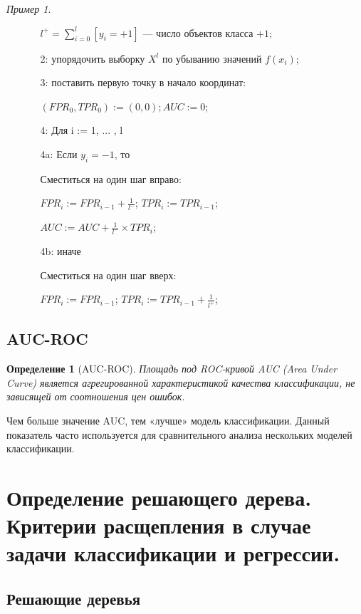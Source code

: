 \documentclass[a4paper, 12pt]{article}
\theoremstyle{plain} %
\newtheorem{definition}{Определение}
\theoremstyle{definition} %
\theoremstyle{remark} %
\newtheorem{example}{Пример}
\begin{document}
\begin{example}
\begin{enumerate}
\begin{enumerate}
			$l^{+} = \sum^{l}_{i=0}[y_{i}=+1]$ --- число объектов класса $+1$;
			\item[2:] упорядочить выборку $X^{l}$ по убыванию значений $f(x_{i})$;
			\item[3:] поставить первую точку в начало координат:

			$(FPR_{0}, TPR_{0}) := (0,0); AUC := 0$;
			\item[4:] Для i := 1, ... , l
			\item[4a:] Если $y_{i} = -1$, то

			Сместиться на один шаг вправо:

			$FPR_{i} := FPR_{i-1} + \frac{1}{l^{-}}$; $TPR_{i} := TPR_{i-1}$;

			$AUC := AUC + \frac{1}{l^{-}}\times TPR_{i}$;
			\item[4b:] иначе

			Сместиться на один шаг вверх:

			$FPR_{i} := FPR_{i-1}$; $TPR_{i} := TPR_{i-1} + \frac{1}{l^{+}}$;
		\end{enumerate}
	\end{enumerate}

\subsection{AUC-ROC}

\begin{definition}[AUC-ROC]
	Площадь под ROC-кривой AUC (Area Under Curve) является агрегированной характеристикой качества классификации, не зависящей от соотношения цен ошибок.
\end{definition}
Чем больше значение AUC, тем «лучше» модель классификации. Данный показатель часто используется для сравнительного анализа нескольких моделей классификации.

\section{Определение решающего дерева. Критерии расщепления в случае задачи классификации и регрессии.}

\subsection{Решающие деревья}


\end{example}
\end{document}
